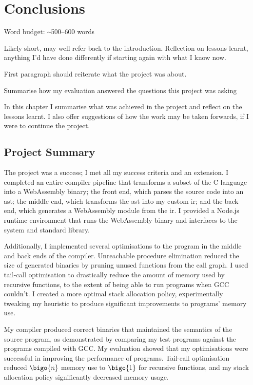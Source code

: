 \documentclass[00-main.tex]{subfiles}
\begin{document}
\chapter{Conclusions}

\begin{mrwComment}
Word budget: \textasciitilde 500--600 words
\end{mrwComment}

\begin{mrwComment}
Likely short, may well refer back to the introduction. Reflection on lessons learnt, anything I'd have done differently if starting again with what I know now.

First paragraph should reiterate what the project was about.

Summarise how my evaluation answered the questions this project was asking
\end{mrwComment}

In this chapter I summarise what was achieved in the project and reflect on the lessons learnt.
I also offer suggestions of how the work may be taken forwards, if I were to continue the project.

\section{Project Summary}

The project was a success; I met all my success criteria and an extension.
I completed an entire compiler pipeline that transforms a subset of the C language into a WebAssembly binary; the front end, which parses the source code into an \gls{ast}; the middle end, which transforms the \gls{ast} into my custom \gls{ir}; and the back end, which generates a WebAssembly module from the \gls{ir}.
I provided a Node.js runtime environment that runs the WebAssembly binary and interfaces to the system and standard library.

Additionally, I implemented several optimisations to the program in the middle and back ends of the compiler.
Unreachable procedure elimination reduced the size of generated binaries by pruning unused functions from the call graph.
I used tail-call optimisation to drastically reduce the amount of memory used by recursive functions, to the extent of being able to run programs when GCC couldn't.
I created a more optimal stack allocation policy, experimentally tweaking my heuristic to produce significant improvements to programs' memory use.

My compiler produced correct binaries that maintained the semantics of the source program, as demonstrated by comparing my test programs against the programs compiled with GCC\@.
My evaluation showed that my optimisations were successful in improving the performance of programs.
Tail-call optimisation reduced $\bigo{n}$ memory use to $\bigo{1}$ for recursive functions, and my stack allocation policy significantly decreased memory usage.
\end{document}
